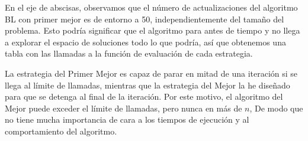\documentclass{article}
\begin{document}
En el eje de abscisas, observamos que el número de actualizaciones del algoritmo BL con primer mejor es de entorno a 50,
independientemente del tamaño del problema. Esto podría significar que el algoritmo para antes de tiempo y no llega a explorar
el espacio de soluciones todo lo que podría, así que obtenemos una tabla con las llamadas a la función de evaluación de cada
estrategia.

La estrategia del Primer Mejor es capaz de parar en mitad de una iteración si se llega al límite de llamadas, mientras que la 
estrategia del Mejor la he diseñado para que se detenga al final de la iteración. Por este motivo, el algoritmo del Mejor puede
exceder el límite de llamadas, pero nunca en más de $n$, De modo que no tiene mucha importancia de cara a los tiempos de ejecución
y al comportamiento del algoritmo.
\end{document}

